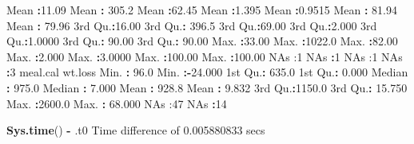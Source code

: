 \documentclass[
]{article}
\newenvironment{Shaded}{\begin{snugshade}}{\end{snugshade}}
\newcommand{\DecValTok}[1]{\textcolor[rgb]{0.00,0.00,0.81}{#1}}
\newcommand{\FloatTok}[1]{\textcolor[rgb]{0.00,0.00,0.81}{#1}}
\newcommand{\FunctionTok}[1]{\textcolor[rgb]{0.13,0.29,0.53}{\textbf{#1}}}
\newcommand{\NormalTok}[1]{#1}
\newcommand{\SpecialCharTok}[1]{\textcolor[rgb]{0.81,0.36,0.00}{\textbf{#1}}}
\newcommand{\StringTok}[1]{\textcolor[rgb]{0.31,0.60,0.02}{#1}}
\begin{document}
\begin{Shaded}
\begin{Highlighting}[]
\NormalTok{ Mean   }\SpecialCharTok{:}\FloatTok{11.09}\NormalTok{   Mean   }\SpecialCharTok{:} \FloatTok{305.2}\NormalTok{   Mean   }\SpecialCharTok{:}\FloatTok{62.45}\NormalTok{   Mean   }\SpecialCharTok{:}\FloatTok{1.395}\NormalTok{   Mean   }\SpecialCharTok{:}\FloatTok{0.9515}\NormalTok{   Mean   }\SpecialCharTok{:} \FloatTok{81.94}\NormalTok{   Mean   }\SpecialCharTok{:} \FloatTok{79.96}  
\NormalTok{ 3rd Qu.}\SpecialCharTok{:}\FloatTok{16.00}\NormalTok{   3rd Qu.}\SpecialCharTok{:} \FloatTok{396.5}\NormalTok{   3rd Qu.}\SpecialCharTok{:}\FloatTok{69.00}\NormalTok{   3rd Qu.}\SpecialCharTok{:}\FloatTok{2.000}\NormalTok{   3rd Qu.}\SpecialCharTok{:}\FloatTok{1.0000}\NormalTok{   3rd Qu.}\SpecialCharTok{:} \FloatTok{90.00}\NormalTok{   3rd Qu.}\SpecialCharTok{:} \FloatTok{90.00}  
\NormalTok{ Max.   }\SpecialCharTok{:}\FloatTok{33.00}\NormalTok{   Max.   }\SpecialCharTok{:}\FloatTok{1022.0}\NormalTok{   Max.   }\SpecialCharTok{:}\FloatTok{82.00}\NormalTok{   Max.   }\SpecialCharTok{:}\FloatTok{2.000}\NormalTok{   Max.   }\SpecialCharTok{:}\FloatTok{3.0000}\NormalTok{   Max.   }\SpecialCharTok{:}\FloatTok{100.00}\NormalTok{   Max.   }\SpecialCharTok{:}\FloatTok{100.00}  
\NormalTok{ NA}\StringTok{\textquotesingle{}s   :1                                                        NA\textquotesingle{}}\NormalTok{s   }\SpecialCharTok{:}\DecValTok{1}\NormalTok{        NA}\StringTok{\textquotesingle{}s   :1        NA\textquotesingle{}}\NormalTok{s   }\SpecialCharTok{:}\DecValTok{3}       
\NormalTok{    meal.cal         wt.loss       }
\NormalTok{ Min.   }\SpecialCharTok{:}  \FloatTok{96.0}\NormalTok{   Min.   }\SpecialCharTok{:{-}}\FloatTok{24.000}  
\NormalTok{ 1st Qu.}\SpecialCharTok{:} \FloatTok{635.0}\NormalTok{   1st Qu.}\SpecialCharTok{:}  \FloatTok{0.000}  
\NormalTok{ Median }\SpecialCharTok{:} \FloatTok{975.0}\NormalTok{   Median }\SpecialCharTok{:}  \FloatTok{7.000}  
\NormalTok{ Mean   }\SpecialCharTok{:} \FloatTok{928.8}\NormalTok{   Mean   }\SpecialCharTok{:}  \FloatTok{9.832}  
\NormalTok{ 3rd Qu.}\SpecialCharTok{:}\FloatTok{1150.0}\NormalTok{   3rd Qu.}\SpecialCharTok{:} \FloatTok{15.750}  
\NormalTok{ Max.   }\SpecialCharTok{:}\FloatTok{2600.0}\NormalTok{   Max.   }\SpecialCharTok{:} \FloatTok{68.000}  
\NormalTok{ NA}\StringTok{\textquotesingle{}s   :47       NA\textquotesingle{}}\NormalTok{s   }\SpecialCharTok{:}\DecValTok{14}       
\end{Highlighting}
\end{Shaded}

\begin{Shaded}
\begin{Highlighting}[]
\FunctionTok{Sys.time}\NormalTok{() }\SpecialCharTok{{-}}\NormalTok{ .t0}
\NormalTok{Time difference of }\FloatTok{0.005880833}\NormalTok{ secs}
\end{Highlighting}
\end{Shaded}
\end{document}
